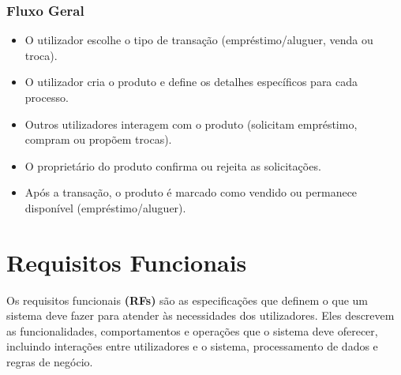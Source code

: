 \documentclass[a4paper, 12pt]{article} %
\begin{document}
\subsubsection{Fluxo Geral}
\begin{itemize}
	\item O utilizador escolhe o tipo de transação (empréstimo/aluguer, venda ou troca).
	\item O utilizador cria o produto e define os detalhes específicos para cada processo.
	\item Outros utilizadores interagem com o produto (solicitam empréstimo, compram ou propõem trocas).
	\item O proprietário do produto confirma ou rejeita as solicitações.
	\item Após a transação, o produto é marcado como vendido ou permanece disponível (empréstimo/aluguer).
\end{itemize}


\newpage
\section{Requisitos Funcionais}
Os requisitos funcionais \textbf{(RFs)} são as especificações que definem o que um sistema deve fazer para atender às necessidades dos utilizadores. Eles descrevem as funcionalidades, comportamentos e operações que o sistema deve oferecer, incluindo interações entre utilizadores e o sistema, processamento de dados e regras de negócio.
\end{document}
